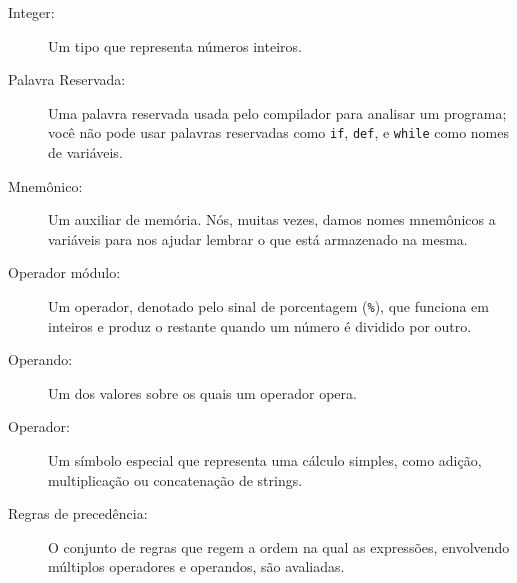 {{{{{{{{{{{{{{{{{\begin{description}
\item[Integer:] Um tipo que representa números inteiros.

\item[Palavra Reservada:] Uma palavra reservada usada pelo compilador para analisar um 
programa; você não pode usar palavras reservadas como {\tt if}, {\tt  def}, e {\tt while} como 
nomes de variáveis.

\item[Mnemônico:] Um auxiliar de memória. Nós, muitas vezes, damos nomes mnemônicos a variáveis 
para nos ajudar lembrar o que está armazenado na mesma.

\item[Operador módulo:] Um operador, denotado pelo sinal de porcentagem 
({\tt \%}), que funciona em inteiros e produz o restante quando um 
número é dividido por outro.

\item[Operando:] Um dos valores sobre os quais um operador opera.

\item[Operador:] Um símbolo especial que representa uma cálculo simples, 
como adição, multiplicação ou concatenação de strings.

\item[Regras de precedência:] O conjunto de regras que regem a ordem na qual as
expressões, envolvendo múltiplos operadores e operandos, são avaliadas.


\end{description}}}}}}}}}}}}}}}}}}
